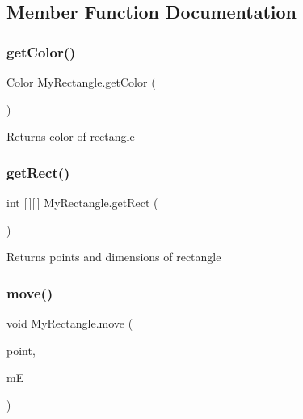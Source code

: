 \subsection{Member Function Documentation}
\mbox{\label{classMyRectangle_af6efeaa07a083d3f0eb6a6b614897aa2}} 
\subsubsection{\texorpdfstring{get\+Color()}{getColor()}}
{\footnotesize\ttfamily Color My\+Rectangle.\+get\+Color (\begin{DoxyParamCaption}{ }\end{DoxyParamCaption})\hspace{0.3cm}{\ttfamily [inline]}}

\begin{DoxyReturn}{Returns}
color of rectangle 
\end{DoxyReturn}
\mbox{\label{classMyRectangle_ab2ba4d93bf3671b4629a75b9d646a7b9}} 
\subsubsection{\texorpdfstring{get\+Rect()}{getRect()}}
{\footnotesize\ttfamily int \mbox{[}$\,$\mbox{]}\mbox{[}$\,$\mbox{]} My\+Rectangle.\+get\+Rect (\begin{DoxyParamCaption}{ }\end{DoxyParamCaption})\hspace{0.3cm}{\ttfamily [inline]}}

\begin{DoxyReturn}{Returns}
points and dimensions of rectangle 
\end{DoxyReturn}
\mbox{\label{classMyRectangle_ac48d581b14240a51851f3e7ef992bdac}} 
\subsubsection{\texorpdfstring{move()}{move()}}
{\footnotesize\ttfamily void My\+Rectangle.\+move (\begin{DoxyParamCaption}\item[{int \mbox{[}$\,$\mbox{]}}]{point,  }\item[{Mouse\+Event}]{mE }\end{DoxyParamCaption})\hspace{0.3cm}{\ttfamily [inline]}}

